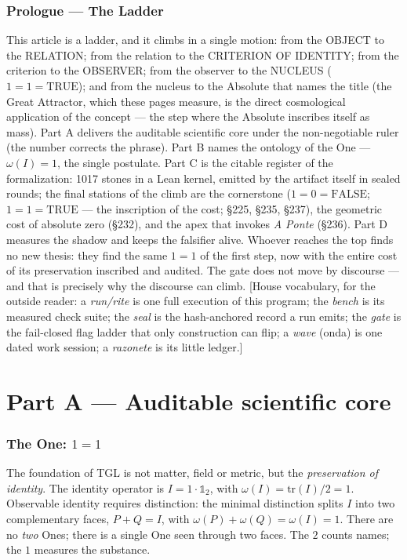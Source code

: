 \documentclass[11pt]{article}
\theoremstyle{definition}\newtheorem{deriv}{Derivation}
\begin{document}
\section*{Prologue --- The Ladder}

\noindent This article is a ladder, and it climbs in a single motion: from the OBJECT to the RELATION; from the relation to the CRITERION OF IDENTITY; from the criterion to the OBSERVER; from the observer to the NUCLEUS ($1{=}1{=}\mathrm{TRUE}$); and from the nucleus to the Absolute that names the title (the Great Attractor, which these pages measure, is the direct cosmological application of the concept --- the step where the Absolute inscribes itself as mass). Part A delivers the auditable scientific core under the non-negotiable ruler (the number corrects the phrase). Part B names the ontology of the One --- $\omega(I){=}1$, the single postulate. Part C is the citable register of the formalization: 1017 stones in a Lean kernel, emitted by the artifact itself in sealed rounds; the final stations of the climb are the cornerstone ($1{=}0{=}\mathrm{FALSE}$; $1{=}1{=}\mathrm{TRUE}$ --- the inscription of the cost; \S225, \S235, \S237), the geometric cost of absolute zero (\S232), and the apex that invokes \emph{A Ponte} (\S236). Part D measures the shadow and keeps the falsifier alive. Whoever reaches the top finds no new thesis: they find the same $1{=}1$ of the first step, now with the entire cost of its preservation inscribed and audited. The gate does not move by discourse --- and that is precisely why the discourse can climb. [House vocabulary, for the outside reader: a \emph{run/rite} is one full execution of this program; the \emph{bench} is its measured check suite; the \emph{seal} is the hash-anchored record a run emits; the \emph{gate} is the fail-closed flag ladder that only construction can flip; a \emph{wave} (onda) is one dated work session; a \emph{razonete} is its little ledger.]

\part{Part A --- Auditable scientific core}

\section{The One: $1=1$}

The foundation of TGL is not matter, field or metric, but the \emph{preservation of identity}. The identity operator is $I=1\cdot\mathbb{1}_2$, with $\omega(I)=\mathrm{tr}(I)/2=1$. Observable identity requires distinction: the minimal distinction splits $I$ into two complementary faces, $P+Q=I$, with $\omega(P)+\omega(Q)=\omega(I)=1$. There are no \emph{two} Ones; there is a single One seen through two faces. The $2$ counts names; the $1$ measures the substance.
\end{document}
